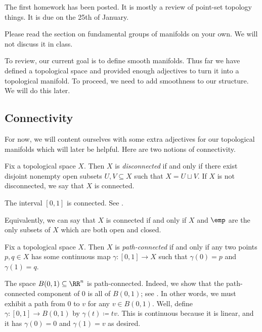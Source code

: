\documentclass[../notes.tex]{subfiles}
\begin{document}
The first homework has been posted. It is mostly a review of point-set topology things. It is due on the 25th of January.
\begin{remark}
	Please read the section on fundamental groups of manifolds on your own. We will not discuss it in class.
\end{remark}
To review, our current goal is to define smooth manifolds. Thus far we have defined a topological space and provided enough adjectives to turn it into a topological manifold. To proceed, we need to add smoothness to our structure. We will do this later.

\subsection{Connectivity}
For now, we will content ourselves with some extra adjectives for our topological manifolds which will later be helpful. Here are two notions of connectivity.
\begin{definition}[connected]
	Fix a topological space $X$. Then $X$ is \textit{disconnected} if and only if there exist disjoint nonempty open subsets $U,V\subseteq X$ such that $X=U\sqcup V$. If $X$ is not disconnected, we say that $X$ is connected.
\end{definition}
\begin{example}
	The interval $[0,1]$ is connected. See \cite[Lemma~A.6]{elber-top}.
\end{example}
\begin{remark}
	Equivalently, we can say that $X$ is connected if and only if $X$ and $\emp$ are the only subsets of $X$ which are both open and closed.
\end{remark}
\begin{definition}
	Fix a topological space $X$. Then $X$ is \textit{path-connected} if and only if any two points $p,q\in X$ has some continuous map $\gamma\colon[0,1]\to X$ such that $\gamma(0)=p$ and $\gamma(1)=q$.
\end{definition}
\begin{example} \label{ex:ball-is-path-conn}
	The space $B(0,1)\subseteq\RR^n$ is path-connected. Indeed, we show that the path-connected component of $0$ is all of $B(0,1)$; see \cite[Definition~A.19]{elber-top}. In other words, we must exhibit a path from $0$ to $v$ for any $v\in B(0,1)$. Well, define $\gamma\colon[0,1]\to B(0,1)$ by $\gamma(t)\coloneqq tv$. This is continuous because it is linear, and it has $\gamma(0)=0$ and $\gamma(1)=v$ as desired.
\end{example}
\end{document}

